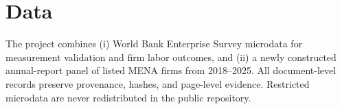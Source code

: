 \section{Data}
The project combines (i) World Bank Enterprise Survey microdata for measurement validation and firm labor outcomes, and (ii) a newly constructed annual-report panel of listed MENA firms from 2018--2025. All document-level records preserve provenance, hashes, and page-level evidence. Restricted microdata are never redistributed in the public repository.
